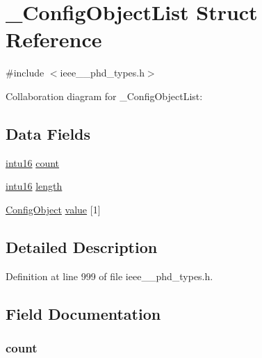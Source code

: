 \hypertarget{struct___config_object_list}{}\section{\+\_\+\+Config\+Object\+List Struct Reference}
\label{struct___config_object_list}


{\ttfamily \#include $<$ieee\+\_\+\_\+phd\+\_\+types.\+h$>$}



Collaboration diagram for \+\_\+\+Config\+Object\+List\+:
\subsection*{Data Fields}
\begin{DoxyCompactItemize}
\item 
\hyperlink{ieee__11073__phd__types_8h_a3561595d2aa7416532e1c9910abd076d}{intu16} \hyperlink{struct___config_object_list_abf6db060ae8e224764b0f867fb135ecd}{count}
\item 
\hyperlink{ieee__11073__phd__types_8h_a3561595d2aa7416532e1c9910abd076d}{intu16} \hyperlink{struct___config_object_list_a3743679e4ff85e3e1b3fc2e59973fbb3}{length}
\item 
\hyperlink{ieee__11073__phd__types_8h_a1ce2e1e677079278549d6d7e359a6ccf}{Config\+Object} \hyperlink{struct___config_object_list_a57fab9fcd4b4fee15a2363d4505d9cf5}{value} \mbox{[}1\mbox{]}
\end{DoxyCompactItemize}


\subsection{Detailed Description}


Definition at line 999 of file ieee\+\_\+\_\+phd\+\_\+types.\+h.



\subsection{Field Documentation}
\hypertarget{struct___config_object_list_abf6db060ae8e224764b0f867fb135ecd}{}
\subsubsection[{count}]{ count}\label{struct___config_object_list_abf6db060ae8e224764b0f867fb135ecd}


